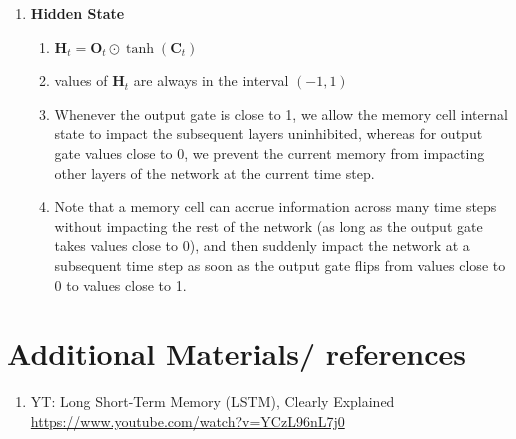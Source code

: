 \begin{enumerate}[itemsep=0.15cm]
    \item \textbf{Hidden State}
    \begin{enumerate}
        \item $\mathbf{H}_t = \mathbf{O}_t \odot \tanh(\mathbf{C}_t)$

        \item values of $\mathbf{H}_t$ are always in the interval $(-1,1)$

        \item Whenever the output gate is close to 1, we allow the memory cell internal state to impact the subsequent layers uninhibited, whereas for output gate values close to 0, we prevent the current memory from impacting other layers of the network at the current time step.

        \item Note that a memory cell can accrue information across many time steps without impacting the rest of the network (as long as the output gate takes values close to 0), and then suddenly impact the network at a subsequent time step as soon as the output gate flips from values close to 0 to values close to 1.
    \end{enumerate}


\end{enumerate}








\section*{Additional Materials/ references}
\begin{enumerate}
    \item YT: Long Short-Term Memory (LSTM), Clearly Explained\\
    \url{https://www.youtube.com/watch?v=YCzL96nL7j0}

\end{enumerate}




